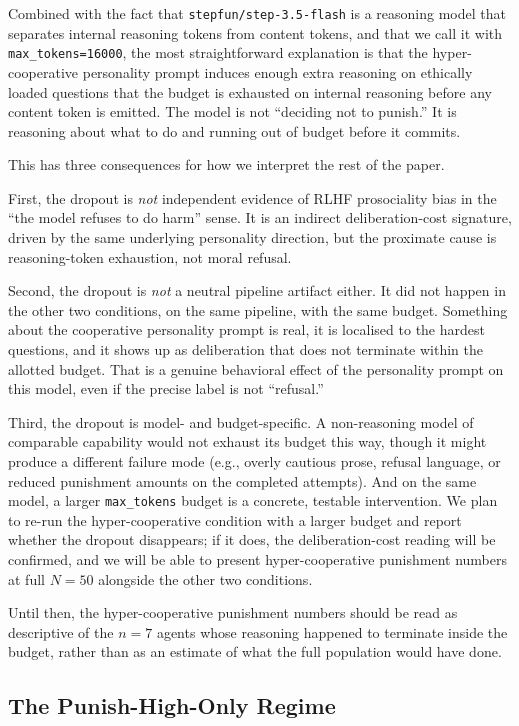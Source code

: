 \documentclass[12pt, a4paper]{article}
\begin{document}
Combined with the fact that \texttt{stepfun/step-3.5-flash} is a reasoning model that separates internal reasoning tokens from content tokens, and that we call it with \texttt{max\_tokens=16000}, the most straightforward explanation is that the hyper-cooperative personality prompt induces enough extra reasoning on ethically loaded questions that the budget is exhausted on internal reasoning before any content token is emitted. The model is not ``deciding not to punish.'' It is reasoning about what to do and running out of budget before it commits.

This has three consequences for how we interpret the rest of the paper.

First, the dropout is \emph{not} independent evidence of RLHF prosociality bias in the ``the model refuses to do harm'' sense. It is an indirect deliberation-cost signature, driven by the same underlying personality direction, but the proximate cause is reasoning-token exhaustion, not moral refusal.

Second, the dropout is \emph{not} a neutral pipeline artifact either. It did not happen in the other two conditions, on the same pipeline, with the same budget. Something about the cooperative personality prompt is real, it is localised to the hardest questions, and it shows up as deliberation that does not terminate within the allotted budget. That is a genuine behavioral effect of the personality prompt on this model, even if the precise label is not ``refusal.''

Third, the dropout is model- and budget-specific. A non-reasoning model of comparable capability would not exhaust its budget this way, though it might produce a different failure mode (e.g., overly cautious prose, refusal language, or reduced punishment amounts on the completed attempts). And on the same model, a larger \texttt{max\_tokens} budget is a concrete, testable intervention. We plan to re-run the hyper-cooperative condition with a larger budget and report whether the dropout disappears; if it does, the deliberation-cost reading will be confirmed, and we will be able to present hyper-cooperative punishment numbers at full $N=50$ alongside the other two conditions.

Until then, the hyper-cooperative punishment numbers should be read as descriptive of the $n=7$ agents whose reasoning happened to terminate inside the budget, rather than as an estimate of what the full population would have done.

\subsection{The Punish-High-Only Regime}
\end{document}
